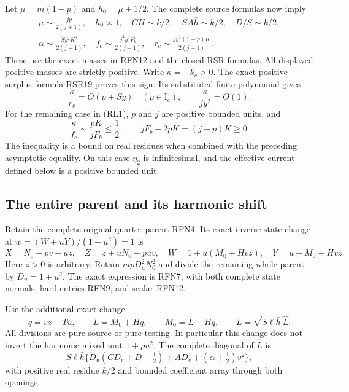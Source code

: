 Let \(\mu=m(1-p)\) and \(h_0=\mu+1/2\).
The complete source formulas now imply
\[
\begin{gathered}
 \mu\sim\frac{jp}{2(j+1)},\quad h_0\asymp1,\quad
 CH\sim k/2,\quad SA\bar h\sim k/2,\quad D/S\sim k/2,\\
 \alpha\sim\frac{Sy^2K^2}{2(j+1)},\quad
 f_c\sim\frac{j^2y^2F_b}{2(j+1)},\quad
 r_c\sim\frac{jy^2(1-p)K}{2(j+1)} .
\end{gathered}                                                   \tag{RL7}
\]
These use the exact masses in RFN12 and the closed RSR formulas.
All displayed positive masses are strictly positive.
Write \(\kappa=-k_c>0\).  The exact positive-surplus formula
RSR19 proves this sign.  Its substituted finite polynomial gives
\[
 \frac{\kappa}{r_c}=O(p+Sy)\quad(p\in\mathrm I_c),\qquad
 \frac{\kappa}{jy^2}=O(1).                              \tag{RL8}
\]
For the remaining case in (RL1), \(p\) and \(j\) are positive
bounded units, and
\[
 \frac{\kappa}{f_c}\sim\frac{pK}{jF_b}\leq\frac12,
 \qquad jF_b-2pK=(j-p)K\geq0.                          \tag{RL9}
\]
The inequality is a bound on real residues when combined with
the preceding asymptotic equality.  On this case \(\eta_2\) is
infinitesimal, and the effective current defined below is a
positive bounded unit.

\subsection{The entire parent and its harmonic shift}

Retain the complete original quarter-parent RFN4.  Its exact inverse
state change at \(w=(W+uY)/(1+u^2)=1\) is
\[
 X=N_0+pv-uz,\quad Z=z+uN_0+puv,\quad
 W=1+u(M_0+Hvz),\quad Y=u-M_0-Hvz.                    \tag{RL10}
\]
Here \(z>0\) is arbitrary.  Retain \(mpD_u^2N_0^2\) and divide
the remaining whole parent by \(D_u=1+u^2\).
The exact expression is RFN7, with both complete state normals,
hard entries RFN9, and scalar RFN12.

Use the additional exact change
\[
 q=vz-Tu,\qquad L=M_0+Hq,\qquad
 M_0=L-Hq,\qquad L=\sqrt{S\ell\bar h}\,\widehat L .
                                                               \tag{RL11}
\]
All divisions are pure source or pure testing.  In particular
this change does not invert the harmonic mixed unit
\(1+\rho u^2\).
The complete diagonal of \(\widehat L\) is
\[
 S\ell\bar h\{D_u(CD_v+D+\tfrac12)+AD_v+
                   (\alpha+\tfrac12)v^2\},
                                                               \tag{RL12}
\]
with positive real residue \(\overline k/2\) and bounded
coefficient array through both openings.

